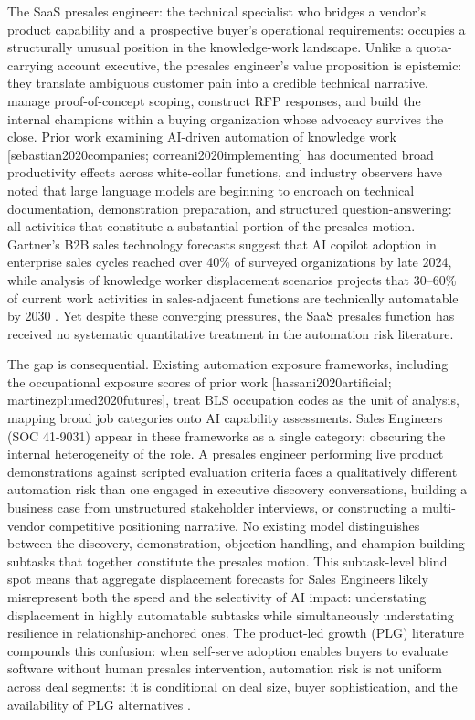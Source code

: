\documentclass[10pt, conference]{IEEEtran}
\begin{document}
The SaaS presales engineer: the technical specialist who bridges a vendor's product capability and a prospective buyer's operational requirements: occupies a structurally unusual position in the knowledge-work landscape. Unlike a quota-carrying account executive, the presales engineer's value proposition is epistemic: they translate ambiguous customer pain into a credible technical narrative, manage proof-of-concept scoping, construct RFP responses, and build the internal champions within a buying organization whose advocacy survives the close. Prior work examining AI-driven automation of knowledge work [sebastian2020companies; correani2020implementing] has documented broad productivity effects across white-collar functions, and industry observers have noted that large language models are beginning to encroach on technical documentation, demonstration preparation, and structured question-answering: all activities that constitute a substantial portion of the presales motion. Gartner's B2B sales technology forecasts suggest that AI copilot adoption in enterprise sales cycles reached over 40\% of surveyed organizations by late 2024, while analysis of knowledge worker displacement scenarios projects that 30--60\% of current work activities in sales-adjacent functions are technically automatable by 2030 \cite{johnk2020ready}. Yet despite these converging pressures, the SaaS presales function has received no systematic quantitative treatment in the automation risk literature.

The gap is consequential. Existing automation exposure frameworks, including the occupational exposure scores of prior work [hassani2020artificial; martinezplumed2020futures], treat BLS occupation codes as the unit of analysis, mapping broad job categories onto AI capability assessments. Sales Engineers (SOC 41-9031) appear in these frameworks as a single category: obscuring the internal heterogeneity of the role. A presales engineer performing live product demonstrations against scripted evaluation criteria faces a qualitatively different automation risk than one engaged in executive discovery conversations, building a business case from unstructured stakeholder interviews, or constructing a multi-vendor competitive positioning narrative. No existing model distinguishes between the discovery, demonstration, objection-handling, and champion-building subtasks that together constitute the presales motion. This subtask-level blind spot means that aggregate displacement forecasts for Sales Engineers likely misrepresent both the speed and the selectivity of AI impact: understating displacement in highly automatable subtasks while simultaneously understating resilience in relationship-anchored ones. The product-led growth (PLG) literature compounds this confusion: when self-serve adoption enables buyers to evaluate software without human presales intervention, automation risk is not uniform across deal segments: it is conditional on deal size, buyer sophistication, and the availability of PLG alternatives \cite{davis2021varieties}.
\end{document}
